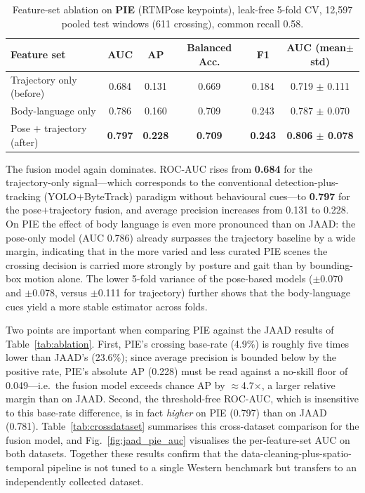 \documentclass[conference]{IEEEtran}
\begin{document}
\begin{table}[t]
\centering
\caption{Feature-set ablation on \textbf{PIE} (RTMPose keypoints), leak-free
5-fold CV, 12{,}597 pooled test windows (611 crossing), common recall 0.58.}
\label{tab:ablation_pie}
\begin{tabular}{lccccc}
\hline
Feature set & AUC & AP & Balanced Acc. & F1 & AUC (mean$\pm$std) \\
\hline
Trajectory only (before)    & 0.684 & 0.131 & 0.669 & 0.184 & 0.719 $\pm$ 0.111 \\
Body-language only          & 0.786 & 0.160 & 0.709 & 0.243 & 0.787 $\pm$ 0.070 \\
Pose $+$ trajectory (after) & \textbf{0.797} & \textbf{0.228} & \textbf{0.709} & \textbf{0.243} & \textbf{0.806 $\pm$ 0.078} \\
\hline
\end{tabular}
\end{table}

The fusion model again dominates. ROC-AUC rises from \textbf{0.684} for the
trajectory-only signal---which corresponds to the conventional
detection-plus-tracking (YOLO$+$ByteTrack) paradigm without behavioural
cues---to \textbf{0.797} for the pose$+$trajectory fusion, and average precision
increases from 0.131 to 0.228. On PIE the effect of body language is even more
pronounced than on JAAD: the pose-only model (AUC 0.786) already surpasses the
trajectory baseline by a wide margin, indicating that in the more varied and
less curated PIE scenes the crossing decision is carried more strongly by
posture and gait than by bounding-box motion alone. The lower 5-fold variance of
the pose-based models ($\pm$0.070 and $\pm$0.078, versus $\pm$0.111 for
trajectory) further shows that the body-language cues yield a more stable
estimator across folds.

Two points are important when comparing PIE against the JAAD results of
Table~\ref{tab:ablation}. First, PIE's crossing base-rate (4.9\%) is roughly five
times lower than JAAD's (23.6\%); since average precision is bounded below by the
positive rate, PIE's absolute AP (0.228) must be read against a no-skill floor of
0.049---i.e.\ the fusion model exceeds chance AP by $\approx$4.7$\times$, a larger
relative margin than on JAAD. Second, the threshold-free ROC-AUC, which is
insensitive to this base-rate difference, is in fact \emph{higher} on PIE (0.797)
than on JAAD (0.781). Table~\ref{tab:crossdataset} summarises this cross-dataset
comparison for the fusion model, and Fig.~\ref{fig:jaad_pie_auc} visualises the
per-feature-set AUC on both datasets. Together these results confirm that the
data-cleaning-plus-spatio-temporal pipeline is not tuned to a single Western
benchmark but transfers to an independently collected dataset.
\end{document}
